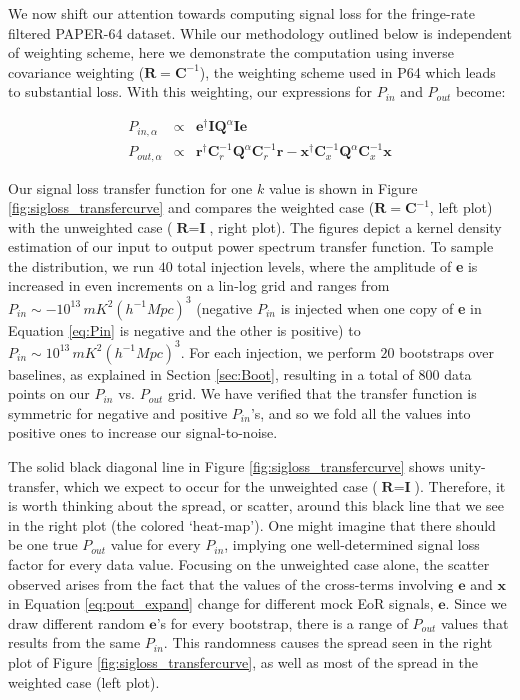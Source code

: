 \documentclass[preprint2,numberedappendix,tighten]{aastex6}  %
\begin{document}
We now shift our attention towards computing signal loss for the fringe-rate filtered PAPER-64 dataset. While our methodology outlined below is independent of weighting scheme, here we demonstrate the computation using inverse covariance weighting ($\textbf{R} = \textbf{C}^{-1}$), the weighting scheme used in P64 which leads to substantial loss. With this weighting, our expressions for $P_{in}$ and $P_{out}$ become:

\begin{eqnarray}
P_{in,\alpha} &\propto& \textbf{e}^{\dagger}\textbf{I}\textbf{Q}^{\alpha}\textbf{I}\textbf{e} \\
P_{out,\alpha} &\propto& \textbf{r}^{\dagger}\textbf{C}_{r}^{-1}\textbf{Q}^{\alpha}\textbf{C}_{r}^{-1}\textbf{r} - \textbf{x}^{\dagger}\textbf{C}_{x}^{-1}\textbf{Q}^{\alpha}\textbf{C}_{x}^{-1}\textbf{x} 
\end{eqnarray}

Our signal loss transfer function for one $k$ value is shown in Figure \ref{fig:sigloss_transfercurve} and compares the weighted case ($\textbf{R} = \textbf{C}^{-1}$, left plot) with the unweighted case ($\textbf{R} = \textbf{I}$, right plot). The figures depict a kernel density estimation of our input to output power spectrum transfer function. To sample the distribution, we run $40$ total injection levels, where the amplitude of \textbf{e} is increased in even increments on a lin-log grid and ranges from $P_{in} \sim -10^{13} \, mK^{2} (h^{-1} Mpc)^{3}$ (negative $P_{in}$ is injected when one copy of \textbf{e} in Equation \eqref{eq:Pin} is negative and the other is positive) to $P_{in} \sim10^{13} \, mK^{2} (h^{-1} Mpc)^{3}$. For each injection, we perform $20$ bootstraps over baselines, as explained in Section \ref{sec:Boot}, resulting in a total of $800$ data points on our $P_{in}$ vs. $P_{out}$ grid. We have verified that the transfer function is symmetric for negative and positive $P_{in}$'s, and so we fold all the values into positive ones to increase our signal-to-noise.

The solid black diagonal line in Figure \ref{fig:sigloss_transfercurve} shows unity-transfer, which we expect to occur for the unweighted case ($\textbf{R} = \textbf{I}$). Therefore, it is worth thinking about the spread, or scatter, around this black line that we see in the right plot (the colored `heat-map'). One might imagine that there should be one true $P_{out}$ value for every $P_{in}$, implying one well-determined signal loss factor for every data value. Focusing on the unweighted case alone, the scatter observed arises from the fact that the values of the cross-terms involving $\textbf{e}$ and $\textbf{x}$ in Equation \eqref{eq:pout_expand} change for different mock EoR signals, $\textbf{e}$. Since we draw different random $\textbf{e}$'s for every bootstrap, there is a range of $P_{out}$ values that results from the same $P_{in}$. This randomness causes the spread seen in the right plot of Figure \ref{fig:sigloss_transfercurve}, as well as most of the spread in the weighted case (left plot).
\end{document}
